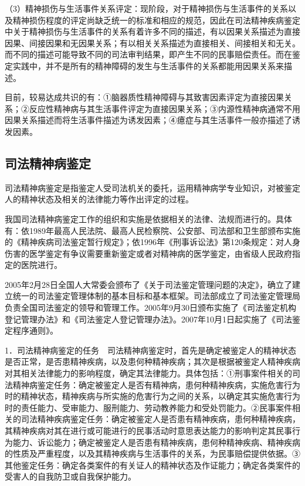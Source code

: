 （3）精神损伤与生活事件关系评定：现阶段，对于精神损伤与生活事件的关系以及精神损伤程度的评定尚缺乏统一的标准和相应的规范，因此在司法精神疾病鉴定中关于精神损伤与生活事件的关系有着许多不同的描述，有以因果关系描述为直接因果、间接因果和无因果关系；有以相关关系描述为直接相关、间接相关和无关。而不同的描述可能导致不同的司法审判结果，即产生不同的民事赔偿责任。而在鉴定实践中，并不是所有的精神障碍的发生与生活事件的关系都能用因果关系来描述。

目前，较易达成共识的有：①脑器质性精神障碍与其致害因素评定为直接因果关系；②反应性精神病与其生活事件评定为直接因果关系；③内源性精神病通常不用因果关系描述而将生活事件描述为诱发因素；④癔症与其生活事件一般亦描述了诱发因素。

\subsection{司法精神病鉴定}

司法精神病鉴定是指鉴定人受司法机关的委托，运用精神病学专业知识，对被鉴定人的精神状态及相关的法律能力等作出评定的过程。

我国司法精神病鉴定工作的组织和实施是依据相关的法律、法规而进行的。具体有：依1989年最高人民法院、最高人民检察院、公安部、司法部和卫生部颁布实施的《精神疾病司法鉴定暂行规定》；依1996年《刑事诉讼法》第120条规定：对人身伤害的医学鉴定有争议需要重新鉴定或者对精神病的医学鉴定，由省级人民政府指定的医院进行。

2005年2月28日全国人大常委会颁布了《关于司法鉴定管理问题的决定》，确立了建立统一的司法鉴定管理体制的基本目标和基本框架。司法部成立了司法鉴定管理局负责全国司法鉴定的领导和管理工作。2005年9月30日颁布实施了《司法鉴定机构登记管理办法》和《司法鉴定人登记管理办法》。2007年10月1日起实施了《司法鉴定程序通则》。

1．司法精神病鉴定的任务　司法精神病鉴定时，首先是确定被鉴定人的精神状态是否正常，是否患精神疾病，以及患何种精神疾病；其次是根据被鉴定人精神疾病对其相关法律能力的影响程度，确定其法律能力。具体包括：①刑事案件相关的司法精神病鉴定任务：确定被鉴定人是否有精神病，患何种精神疾病，实施危害行为时的精神状态，精神疾病与所实施的危害行为之间的关系，以确定其实施危害行为时的责任能力、受审能力、服刑能力、劳动教养能力和受处罚能力。②民事案件相关的司法精神疾病鉴定任务：确定被鉴定人是否患有精神疾病，患何种精神疾病，其精神疾病对其在进行或可能进行的民事活动时意思表达能力的影响判定其民事行为能力、诉讼能力；确定被鉴定人是否患有精神疾病，患何种精神疾病、精神疾病的性质及严重程度，以及其精神疾病与生活事件的关系，为民事赔偿提供依据。③其他鉴定任务：确定各类案件的有关证人的精神状态及作证能力；确定各类案件的受害人的自我防卫或自我保护能力。

